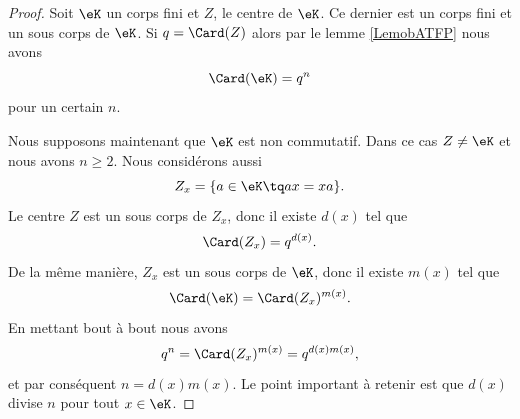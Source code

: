 \begin{proof}
    Soit \( \eK\) un corps fini et \( Z\), le centre de \( \eK\). Ce dernier est un corps fini et un sous corps de \( \eK\). Si \( q=\Card(Z)\) alors par le lemme \ref{LemobATFP} nous avons
    \begin{equation}
        \Card(\eK)=q^n
    \end{equation}
    pour un certain \( n\).

    Nous supposons maintenant que \( \eK\) est non commutatif. Dans ce cas \( Z\neq \eK\) et nous avons \( n\geq 2\). Nous considérons aussi
    \begin{equation}
        Z_x=\{ a\in \eK\tq ax=xa \}.
    \end{equation}
    Le centre \( Z\) est un sous corps de \( Z_x\), donc il existe \( d(x)\) tel  que
    \begin{equation}
        \Card(Z_x)=q^{d(x)}.
    \end{equation}
    De la même manière, \( Z_x\) est un sous corps de \( \eK\), donc il existe \( m(x)\) tel que
    \begin{equation}
        \Card(\eK)=\Card(Z_x)^{m(x)}.
    \end{equation}
    En mettant bout à bout nous avons
    \begin{equation}
        q^n=\Card(Z_x)^{m(x)}=q^{d(x)m(x)},
    \end{equation}
    et par conséquent \( n=d(x)m(x)\). Le point important à retenir est que \( d(x)\) divise \( n\) pour tout \( x\in \eK\).


\end{proof}
